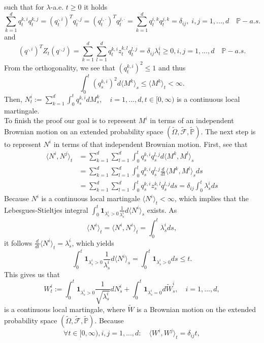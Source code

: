 \documentclass[a4paper,12pt,twoside]{article}
\begin{document}
{\[    \]
    such that for $\lambda$-a.e. $t \geq 0$ it holds 
    \[
    \sum_{k=1}^d q_t^{k,i} q_t^{k,j} = (q_t^{\cdot,i})^T q_t^{\cdot,j} = (q_t^{i,\cdot})^T q_t^{j,\cdot} = \sum_{k=1}^d q_t^{i,k} q_t^{j,k} =\delta_{ij}, \; i,j=1,...,d \quad \mathbb{P}-a.s.
    \]
    and 
    \[
    (q^{\cdot,i})^T Z_t (q^{\cdot,j}) = \sum_{k=1}^d \sum_{l=1}^d q_t^{k,i} z_t^{k,l} q_t^{l,j} = \delta_{ij} \lambda_t^i \geq 0, i,j=1,...,d \quad \mathbb{P}-a.s.
    \]
    From the orthogonality, we see that $(q_t^{k,i})^2 \leq 1$ and thus 
    \[
    \int_0^t (q_s^{k,i})^2 d \langle M^k \rangle_s \leq \langle M^k \rangle_t < \infty.
    \]
    Then, $N_t^i := \sum_{k=1}^d \int_0^t q_s^{k,i} d M_s^k, \quad i=1,...,d, t \in [0,\infty)$ is a continuous local martingale. \\
    To finish the proof our goal is to represent $M^i$ in terms of an independent Brownian motion on an extended probability space $(\tilde{\Omega},\tilde{\mathcal{F}},\tilde{\mathbb{P}})$. The next step is to represent $N^i$ in terms of that independent Brownian motion. First, see that 
    \begin{align*}
        \langle N^i , N^j \rangle_t &= \sum_{k=1}^d \sum_{l=1}^d \int_0^t q_s^{k,i} q_s^{l,j} d \langle M^k,M^l \rangle_s \\
        &= \sum_{k=1}^d \sum_{l=1}^d \int_0^t q_s^{k,i} q_s^{l,j} \frac{d}{dt} \langle M^k , M^l \rangle_s ds \\
        &= \sum_{k=1}^d \sum_{l=1}^d \int_0^t q_s^{k,i} z_s^{k,l} q_s^{l,j} ds = \delta_{ij} \int_0^t \lambda_s^i ds 
    \end{align*} 
    Because $N^i$ is a continuous local martingale $\langle N^i \rangle_t< \infty$, which implies that the Lebesgues-Stieltjes integral $ \int_0^t \textbf{1}_{\lambda_s^i>0} \frac{1}{\lambda_s^i} d \langle N^i \rangle_s $ exists. As 
    \[
     \langle N^i \rangle_t=\langle N^i , N^i \rangle_t= \int_0^t \lambda_s^i ds,
    \] 
    it follows $\frac{d}{dt} \langle N^i \rangle_t= \lambda_s^i$, which yields
    \[
    \int_0^t \textbf{1}_{\lambda_s^i>0} \frac{1}{\lambda_s^i} d \langle N^i \rangle_s = \int_0^t \textbf{1}_{\lambda_s^i>0} ds \leq t.
    \]
    This gives us that 
    \[
    W_t^i := \int_0^t \textbf{1}_{\lambda_s^i>0} \frac{1}{\sqrt{\lambda_s^i}} d N_s^i + \int_0^t \textbf{1}_{\lambda_s^i=0} d \tilde{W}_s^i, \quad i=1,...,d,
    \]
    is a continuous local martingale, where $\tilde{W}$ is a Brownian motion on the extended probability space $(\tilde{\Omega},\tilde{\mathcal{F}},\tilde{\mathbb{P}})$. Because 
    \[
    \forall t \in [0,\infty), i,j=1,...,d: \quad \langle W^i, W^j \rangle_t = \delta_{ij} t,
\]}
\end{document}
